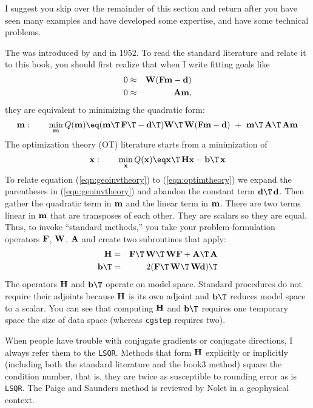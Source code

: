 \par
I suggest you skip over the remainder of this section and return
after you have seen many examples and have developed some expertise,
and have some technical problems.
\par
The  was introduced
by  and  in 1952.
To read the standard literature and relate it to this book,
you should first realize that when I write fitting goals like
\begin{eqnarray}
 0  &\approx&  \bold W( \bold F \bold m - \bold d ) \\
 0  &\approx&  \bold A \bold m,
\end{eqnarray}
they are equivalent to minimizing the quadratic form:
\begin{equation}
\bold  m:  \quad\quad
\min_{\bold m}  Q(\bold m) \eq
( \bold m\T\,\bold F\T - \bold d\T)\bold W\T\,\bold W
( \bold F \bold m  - \bold d)
\ +\ \bold m\T\,\bold A\T\,\bold A\bold m
\label{eqn:geoinvtheory}
\end{equation}
The optimization theory (OT) literature starts from a minimization of
\begin{equation}
 \bold x:  \quad\quad
 \min_{\bold x} Q(\bold x) \eq \bold x\T\,\bold H \bold x - \bold b\T\,\bold x
\label{eqn:optimtheory}
\end{equation}
To relate equation (\ref{eqn:geoinvtheory}) to (\ref{eqn:optimtheory})
we expand the parentheses in (\ref{eqn:geoinvtheory}) 
and abandon the constant term $\bold d\T\,\bold d$.
Then gather the quadratic term in $\bold m$ and the linear term in $\bold m$.
There are two terms linear in $\bold m$
that are transposes of each other.
They are scalars so they are equal.
Thus, to invoke ``standard methods,'' you take
your problem-formulation operators $\bold F$, $\bold W$, $\bold A$
and create two subroutines that apply:
\begin{eqnarray}
 \bold H   &=&  \bold F\T\,\bold W\T\,\bold W\bold F + \bold A\T\,\bold A  \\
 \bold b\T  &=&  2(\bold F\T\,\bold W\T\,\bold W\bold d)\T
\end{eqnarray}
The operators $\bold H$ and $\bold b\T$ operate on model space.
Standard procedures do not require their adjoints
because $\bold H$ is its own adjoint and $\bold b\T$
reduces model space to a scalar.
You can see that computing $\bold H$ and $\bold b\T$ requires
one temporary space the size of data space
(whereas \texttt{cgstep} requires two).
\par
When people have trouble with conjugate gradients or conjugate
directions, I always refer them to the  {\tt LSQR}.  Methods that form $\bold H$ explicitly or
implicitly (including both the standard literature and the book3
method) square the condition number, that is, they are twice as
susceptible to rounding error as is {\tt LSQR}. The Paige and
Saunders method is reviewed by Nolet in a geophysical context. 

